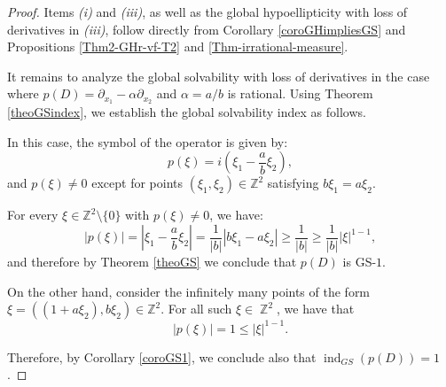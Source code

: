 \documentclass[11pt]{amsart}
\numberwithin{equation}{section}
\theoremstyle{definition}
\DeclareMathOperator{\Z}{\mathbb{Z}}
\begin{document}
	
	\begin{proof}
		Items {\it (i)} and {\it (iii)}, as well as the global hypoellipticity with loss of derivatives in {\it (iii)}, follow directly from Corollary \ref{coroGHimpliesGS} and Propositions \ref{Thm2-GHr-vf-T2} and \ref{Thm-irrational-measure}.
		
		It remains to analyze the global solvability with loss of derivatives in the case where \( p(D) = \partial_{x_1} - \alpha \partial_{x_2} \) and \( \alpha = a/b \) is rational. Using Theorem \ref{theoGSindex}, we establish the global solvability index as follows.
				
		In this case, the symbol of the operator is given by:
		\[
		p(\xi) = i\left(\xi_1 - \frac{a}{b} \xi_2\right),
		\]
		and \( p(\xi) \neq 0 \) except for points \( (\xi_1, \xi_2) \in \mathbb{Z}^2 \) satisfying \( b \xi_1 = a \xi_2 \).
		
		For every \( \xi \in \mathbb{Z}^2 \setminus \{0\} \) with \( p(\xi) \neq 0 \), we have:
		\[
		|p(\xi)| = \left| \xi_1 - \frac{a}{b} \xi_2 \right| = \frac{1}{|b|} |b \xi_1 - a \xi_2| \geq \frac{1}{|b|} \geq \frac{1}{|b|} |\xi|^{1 - 1},
		\]
		and therefore by Theorem \ref{theoGS} we conclude that $p(D)$ is GS-$1$.
		
		On the other hand, consider the infinitely many points of the form \( \xi = ((1 + a \xi_2), b\xi_2) \in \mathbb{Z}^2 \). For all such $\xi\in\Z^2$, we have that
		\[
		 |p(\xi)| = 1 \leq  |\xi|^{1 - 1}.
		\]

		Therefore, by Corollary  \ref{coroGS1}, we conclude also that $\operatorname{ind}_{GS}(p(D))=1$.
	\end{proof}
	
\end{document}
